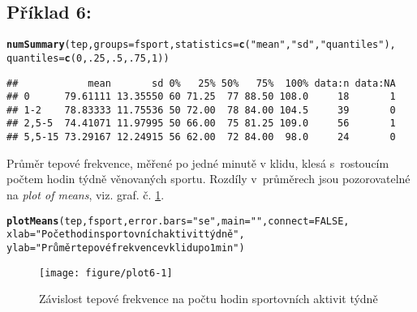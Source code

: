 \documentclass[twoside]{article}\usepackage[]{graphicx}\usepackage[]{color}
\makeatletter
\def\maxwidth{ %
  \ifdim\Gin@nat@width>\linewidth
    \linewidth
  \else
    \Gin@nat@width
  \fi
}
\newcommand{\hlnum}[1]{\textcolor[rgb]{0.686,0.059,0.569}{#1}}%
\newcommand{\hlstr}[1]{\textcolor[rgb]{0.192,0.494,0.8}{#1}}%
\newcommand{\hlstd}[1]{\textcolor[rgb]{0.345,0.345,0.345}{#1}}%
\newcommand{\hlkwc}[1]{\textcolor[rgb]{0.333,0.667,0.333}{#1}}%
\newcommand{\hlkwd}[1]{\textcolor[rgb]{0.737,0.353,0.396}{\textbf{#1}}}%
\newenvironment{kframe}{%
 \def\at@end@of@kframe{}%
 \ifinner\ifhmode%
  \def\at@end@of@kframe{\end{minipage}}%
  \begin{minipage}{\columnwidth}%
 \fi\fi%
 \def\FrameCommand##1{\hskip\@totalleftmargin \hskip-\fboxsep
 \colorbox{shadecolor}{##1}\hskip-\fboxsep
     \hskip-\linewidth \hskip-\@totalleftmargin \hskip\columnwidth}%
 \MakeFramed {\advance\hsize-\width
   \@totalleftmargin\z@ \linewidth\hsize
   \@setminipage}}%
 {\par\unskip\endMakeFramed%
 \at@end@of@kframe}
\newenvironment{knitrout}{}{} %
\makeatother
\begin{document}
\subsection*{Příklad 6:}
\begin{knitrout}
\color{fgcolor}\begin{kframe}
\begin{alltt}
\hlkwd{numSummary}\hlstd{(tep,} \hlkwc{groups}\hlstd{=fsport,} \hlkwc{statistics}\hlstd{=}\hlkwd{c}\hlstd{(}\hlstr{"mean"}\hlstd{,} \hlstr{"sd"}\hlstd{,} \hlstr{"quantiles"}\hlstd{),}
    \hlkwc{quantiles}\hlstd{=}\hlkwd{c}\hlstd{(}\hlnum{0}\hlstd{,}\hlnum{.25}\hlstd{,}\hlnum{.5}\hlstd{,}\hlnum{.75}\hlstd{,}\hlnum{1}\hlstd{))}
\end{alltt}
\begin{verbatim}
##            mean       sd 0%   25% 50%   75%  100% data:n data:NA
## 0      79.61111 13.35550 60 71.25  77 88.50 108.0     18       1
## 1-2    78.83333 11.75536 50 72.00  78 84.00 104.5     39       0
## 2,5-5  74.41071 11.97995 50 66.00  75 81.25 109.0     56       1
## 5,5-15 73.29167 12.24915 56 62.00  72 84.00  98.0     24       0
\end{verbatim}
\end{kframe}
\end{knitrout}

Průměr tepové frekvence, měřené po jedné minutě v klidu, klesá s~rostoucím počtem hodin týdně věnovaných sportu. Rozdíly v~průměrech jsou pozorovatelné na \emph{plot of means}, viz. graf. č. \ref{fig:plot6}.

\begin{knitrout}
\color{fgcolor}\begin{kframe}
\begin{alltt}
\hlkwd{plotMeans}\hlstd{(tep, fsport,} \hlkwc{error.bars}\hlstd{=}\hlstr{"se"}\hlstd{,} \hlkwc{main}\hlstd{=}\hlstr{""}\hlstd{,} \hlkwc{connect}\hlstd{=}\hlnum{FALSE}\hlstd{,}
    \hlkwc{xlab}\hlstd{=}\hlstr{"Počet hodin sportovních aktivit týdně"}\hlstd{,}
    \hlkwc{ylab}\hlstd{=}\hlstr{"Průměr tepové frekvence v klidu po 1 min"}\hlstd{)}
\end{alltt}
\end{kframe}\begin{figure}[h]
\texttt{[image: figure/plot6-1]} \caption[Závislost tepové frekvence na počtu hodin sportovních aktivit týdně]{Závislost tepové frekvence na počtu hodin sportovních aktivit týdně}\label{fig:plot6}
\end{figure}


\end{knitrout}
\end{document}

